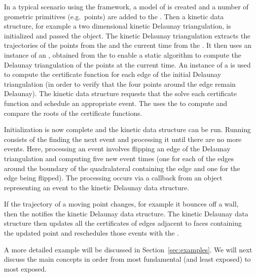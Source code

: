 In a typical scenario using the framework, a model of
 is created and a number of geometric primitives
(e.g.\ points) are added to the
. Then a kinetic data
structure, for example a two dimensional kinetic Delaunay
triangulation, is initialized and passed the 
object. The kinetic Delaunay triangulation extracts the trajectories
of the points from the  and
the current time from the . It then uses an instance of
an , obtained from the 
to enable a static algorithm to compute the Delaunay triangulation of
the points at the current time. An instance of a 
is used to compute the  certificate function for each
edge of the initial Delaunay triangulation (in order to verify that
the four points around the edge remain Delaunay). The kinetic data
structure requests that the  solve each certificate
function and schedule an appropriate event. The  uses
the  to compute and compare the roots of the
certificate functions.

Initialization is now complete and the kinetic data structure can be
run. Running consists of the  finding the next event
and processing it until there are no more events. Here, processing an
event involves flipping an edge of the Delaunay triangulation and
computing five new event times (one for each of the edges around the
boundary of the quadralateral containing the edge and one for the edge
being flipped). The processing occurs via a callback from an object
representing an event to the kinetic Delaunay data structure.

If the trajectory of a moving point changes, for example it bounces
off a wall, then the  notifies the kinetic Delaunay data
structure. The kinetic Delaunay data structure then updates all the
certificates of edges adjacent to faces containing the updated point and
reschedules those events with the .

A more detailed example will be discussed in
Section~\ref{sec:examples}. We will next discuss the main concepts in
order from most fundamental (and least exposed) to most exposed.

